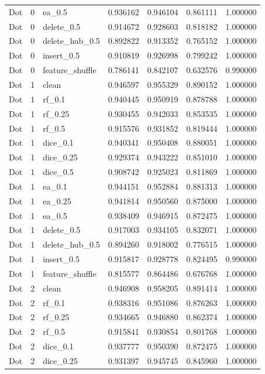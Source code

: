 \documentclass[UTF8,a4paper,11pt,fontset=fandol]{ctexart}
\begin{document}
{\begin{longtable}{lrlrrrr}
Dot & 0 & ea\_0.5 & 0.936162 & 0.946104 & 0.861111 & 1.000000 \\
Dot & 0 & delete\_0.5 & 0.914672 & 0.928603 & 0.818182 & 1.000000 \\
Dot & 0 & delete\_hub\_0.5 & 0.892822 & 0.913352 & 0.765152 & 1.000000 \\
Dot & 0 & insert\_0.5 & 0.910819 & 0.926998 & 0.799242 & 1.000000 \\
Dot & 0 & feature\_shuffle & 0.786141 & 0.842107 & 0.632576 & 0.990000 \\
Dot & 1 & clean & 0.946597 & 0.955329 & 0.890152 & 1.000000 \\
Dot & 1 & rf\_0.1 & 0.940445 & 0.950919 & 0.878788 & 1.000000 \\
Dot & 1 & rf\_0.25 & 0.930455 & 0.942033 & 0.853535 & 1.000000 \\
Dot & 1 & rf\_0.5 & 0.915576 & 0.931852 & 0.819444 & 1.000000 \\
Dot & 1 & dice\_0.1 & 0.940341 & 0.950408 & 0.880051 & 1.000000 \\
Dot & 1 & dice\_0.25 & 0.929374 & 0.943222 & 0.851010 & 1.000000 \\
Dot & 1 & dice\_0.5 & 0.908742 & 0.925023 & 0.811869 & 1.000000 \\
Dot & 1 & ea\_0.1 & 0.944151 & 0.952884 & 0.881313 & 1.000000 \\
Dot & 1 & ea\_0.25 & 0.941814 & 0.950560 & 0.875000 & 1.000000 \\
Dot & 1 & ea\_0.5 & 0.938409 & 0.946915 & 0.872475 & 1.000000 \\
Dot & 1 & delete\_0.5 & 0.917003 & 0.934105 & 0.832071 & 1.000000 \\
Dot & 1 & delete\_hub\_0.5 & 0.894260 & 0.918002 & 0.776515 & 1.000000 \\
Dot & 1 & insert\_0.5 & 0.915817 & 0.928778 & 0.824495 & 0.990000 \\
Dot & 1 & feature\_shuffle & 0.815577 & 0.864486 & 0.676768 & 1.000000 \\
Dot & 2 & clean & 0.946908 & 0.958205 & 0.891414 & 1.000000 \\
Dot & 2 & rf\_0.1 & 0.938316 & 0.951086 & 0.876263 & 1.000000 \\
Dot & 2 & rf\_0.25 & 0.934665 & 0.946880 & 0.862374 & 1.000000 \\
Dot & 2 & rf\_0.5 & 0.915841 & 0.930854 & 0.801768 & 1.000000 \\
Dot & 2 & dice\_0.1 & 0.937777 & 0.950390 & 0.872475 & 1.000000 \\
Dot & 2 & dice\_0.25 & 0.931397 & 0.945745 & 0.845960 & 1.000000 \\

\end{longtable}}
\end{document}

